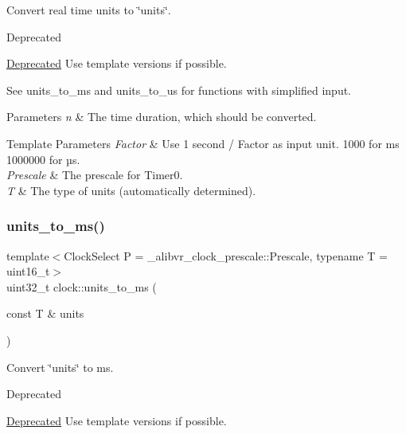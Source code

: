 Convert real time units to \char`\"{}units\char`\"{}. 

\begin{DoxyRefDesc}{Deprecated}
\item[\hyperlink{deprecated__deprecated000002}{Deprecated}]Use template versions if possible.\end{DoxyRefDesc}


See units\+\_\+to\+\_\+ms and units\+\_\+to\+\_\+us for functions with simplified input.


\begin{DoxyParams}{Parameters}
{\em n} & The time duration, which should be converted. \\
\hline
\end{DoxyParams}

\begin{DoxyTemplParams}{Template Parameters}
{\em Factor} & Use 1 second / Factor as input unit. 1\textquotesingle{}000 for ms 1\textquotesingle{}000\textquotesingle{}000 for µs. \\
\hline
{\em Prescale} & The prescale for {\ttfamily Timer0}. \\
\hline
{\em T} & The type of units (automatically determined). \\
\hline
\end{DoxyTemplParams}
\hypertarget{namespaceclock_a64b11929624655a5ac990b12829c8606}{}\label{namespaceclock_a64b11929624655a5ac990b12829c8606} 
\subsubsection{\texorpdfstring{units\+\_\+to\+\_\+ms()}{units\_to\_ms()}\hspace{0.1cm}{\footnotesize\ttfamily [1/2]}}
{\footnotesize\ttfamily template$<$Clock\+Select P = \+\_\+alibvr\+\_\+clock\+\_\+prescale\+::\+Prescale, typename T  = uint16\+\_\+t$>$ \\
uint32\+\_\+t clock\+::units\+\_\+to\+\_\+ms (\begin{DoxyParamCaption}\item[{const T \&}]{units }\end{DoxyParamCaption})\hspace{0.3cm}{\ttfamily [inline]}}



Convert \char`\"{}units\char`\"{} to ms. 

\begin{DoxyRefDesc}{Deprecated}
\item[\hyperlink{deprecated__deprecated000005}{Deprecated}]Use template versions if possible.\end{DoxyRefDesc}



